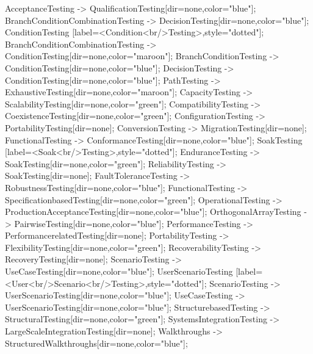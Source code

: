 \documentclass{article}
\begin{document}
{AcceptanceTesting -> QualificationTesting[dir=none,color="blue"];
BranchConditionCombinationTesting -> DecisionTesting[dir=none,color="blue"];
ConditionTesting [label=<Condition<br/>Testing>,style="dotted"];
BranchConditionCombinationTesting -> ConditionTesting[dir=none,color="maroon"];
BranchConditionTesting -> ConditionTesting[dir=none,color="blue"];
DecisionTesting -> ConditionTesting[dir=none,color="blue"];
PathTesting -> ExhaustiveTesting[dir=none,color="maroon"];
CapacityTesting -> ScalabilityTesting[dir=none,color="green"];
CompatibilityTesting -> CoexistenceTesting[dir=none,color="green"];
ConfigurationTesting -> PortabilityTesting[dir=none];
ConversionTesting -> MigrationTesting[dir=none];
FunctionalTesting -> ConformanceTesting[dir=none,color="blue"];
SoakTesting [label=<Soak<br/>Testing>,style="dotted"];
EnduranceTesting -> SoakTesting[dir=none,color="green"];
ReliabilityTesting -> SoakTesting[dir=none];
FaultToleranceTesting -> RobustnessTesting[dir=none,color="blue"];
FunctionalTesting -> SpecificationbasedTesting[dir=none,color="green"];
OperationalTesting -> ProductionAcceptanceTesting[dir=none,color="blue"];
OrthogonalArrayTesting -> PairwiseTesting[dir=none,color="blue"];
PerformanceTesting -> PerformancerelatedTesting[dir=none];
PortabilityTesting -> FlexibilityTesting[dir=none,color="green"];
RecoverabilityTesting -> RecoveryTesting[dir=none];
ScenarioTesting -> UseCaseTesting[dir=none,color="blue"];
UserScenarioTesting [label=<User<br/>Scenario<br/>Testing>,style="dotted"];
ScenarioTesting -> UserScenarioTesting[dir=none,color="blue"];
UseCaseTesting -> UserScenarioTesting[dir=none,color="blue"];
StructurebasedTesting -> StructuralTesting[dir=none,color="green"];
SystemsIntegrationTesting -> LargeScaleIntegrationTesting[dir=none];
Walkthroughs -> StructuredWalkthroughs[dir=none,color="blue"];

}
\end{document}
